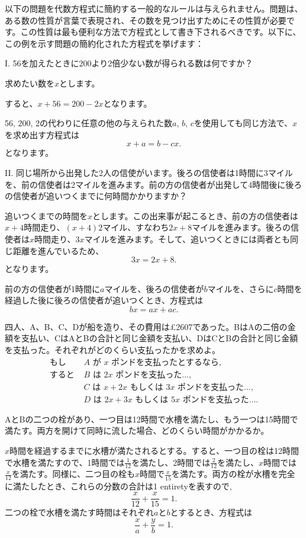 \documentclass[a4paper,11pt,openany]{ltjsbook}
\newcommand{\Add}[1]{#1}
\begin{document}
以下の問題を代数方程式に簡約する一般的なルールは与えられません。問題は、ある数の性質が言葉で表現され、その数を見つけ出すためにその性質が必要です。この性質は最も便利な方法で方程式として書き下されるべきです。以下に、この例を示す問題の簡約化された方程式を挙げます：

I. 56を加えたときに200より2倍少ない数が得られる数は何ですか？

求めたい数を$x$とします。

すると、$x + 56 = 200 - 2x$となります。

56, 200, 2の代わりに任意の他の与えられた数$a$, $b$, $c$を使用しても同じ方法で、$x$を求め出す方程式は
\[
x + a = b - cx.
\]
となります。

II. 同じ場所から出発した2人の信使がいます。後ろの信使者は1時間に3マイルを、前の信使者は2マイルを進みます。前の方の信使者が出発して4時間後に後ろの信使者が追いつくまでに何時間かかりますか？

追いつくまでの時間を$x$とします。この出来事が起こるとき、前の方の信使者は$x + 4$時間走り、$(x + 4)2$マイル、すなわち$2x + 8$マイルを進みます。後ろの信使者は$x$時間走り、$3x$マイルを進みます。そして、追いつくときには両者とも同じ距離を進んでいるため、
\[
3x = 2x + 8.
\]
となります。

前の方の信使者が1時間に$a$マイルを、後ろの信使者が$b$マイルを、さらに$c$時間を経過した後に後ろの信使者が追いつくとき、方程式は
\[
bx = ax + ac.
\]

四人、A、B、C、Dが船を造り、その費用は£2607であった。BはAの二倍の金額を支払い、CはAとBの合計と同じ金額を支払い、DはCとBの合計と同じ金額を支払った。それぞれがどのくらい支払ったかを求めよ。
\begin{align*}
\text{もし } &A \text{ が } x \text{ ポンドを支払ったとするなら,} \\
\text{すると } &B \text{ は } 2x \text{ ポンドを支払った}\dots\Add{,} \\
              &C \text{ は } x + 2x \text{ もしくは } 3x \text{ ポンドを支払った}\dots\Add{,} \\
              &D \text{ は } 2x + 3x \text{ もしくは } 5x \text{ ポンドを支払った}\dots\Add{.}
\end{align*}

AとBの二つの栓があり、一つ目は12時間で水槽を満たし、もう一つは15時間で満たす。両方を開けて同時に流した場合、どのくらい時間がかかるか。

$x$時間を経過するまでに水槽が満たされるとする。すると、一つ目の栓は12時間で水槽を満たすので、1時間では$\frac{1}{12}$を満たし、2時間では$\frac{2}{12}$を満たし、$x$時間では$\frac{x}{12}$を満たす。同様に、二つ目の栓も$x$時間で$\frac{x}{15}$を満たす。両方の栓が水槽を完全に満たしたとき、これらの分数の合計は1 entiretyを表すので,
\[
\frac{x}{12} + \frac{x}{15} = 1.
\]
二つの栓で水槽を満たす時間はそれぞれ$a$と$b$とするとき、方程式は
\[
\frac{x}{a} + \frac{y}{b} = 1.
\]
\end{document}
